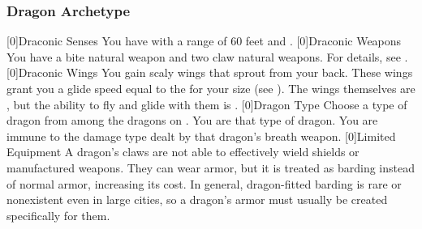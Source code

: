         \subsubsection{Dragon Archetype}
            [0]{Draconic Senses} You have   with a range of 60 feet and .
            [0]{Draconic Weapons} You have a bite natural weapon and two claw natural weapons.
                For details, see .
            [0]{Draconic Wings} You gain scaly wings that sprout from your back.
                These wings grant you a glide speed equal to the  for your size (see ).
                The wings themselves are , but the ability to fly and glide with them is .
            [0]{Dragon Type} Choose a type of dragon from among the dragons on .
                You are that type of dragon.
                You are immune to the damage type dealt by that dragon's breath weapon.
            [0]{Limited Equipment} A dragon's claws are not able to effectively wield shields or manufactured weapons.
            They can wear armor, but it is treated as barding instead of normal armor, increasing its cost.
            In general, dragon-fitted barding is rare or nonexistent even in large cities, so a dragon's armor must usually be created specifically for them.

